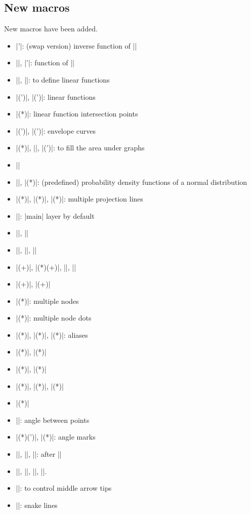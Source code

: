 \subsection{New macros}

New macros have been added.

\begin{itemize}\tightlist
\item |\tzfn'|: (swap version) inverse function of |\tzfn|
\item |\tzfnofy|, |\tzfnofy'|: function of |\y|
\item |\tzdefLFn|, |\tzdefLFnofy|: to define linear functions
\item |\tzLFn(')|, |\tzLFnofy(')|: linear functions
\item |\tzLFnXpoint(*)|: linear function intersection points
\item |\tzfnmin(')|, |\tzfnmax(')|: envelope curves
%
\listdivider
\item |\tzfnarea(*)|, |\settzfnarealayer|, |\tzfnarealine(')|: to fill the area under graphs
\item |\settzfnarealinestyle|
\item |\tzpdfZ|, |\tzpdfN(*)|: (predefined) probability density functions of a normal distribution
\item |\tzprojs(*)|, |\tzprojsx(*)|, |\tzprojsy(*)|: multiple projection lines
\item |\settzpathlayer|: |main| layer by default
%
\listdivider
\item |\tzslope|, |\tzslopeat|
\item |\settzslopelayer|, |\settzslopeatlayer|, |\settzslopeepsilon|
%
\listdivider
\item |\tzlink(+)|, |\tzlinks(*)(+)|, |\settzlinkstyle|, |\settzpathstyle|
\item |\tzedge(+)|, |\tzedges(+)|
%
\listdivider
\item |\tznodes(*)|: multiple nodes
\item |\tznodedots(*)|: multiple node dots
\item |\tznoderectangle(*)|, |\tznodebox(*)|, |\tznodeoval(*)|: aliases
%
\listdivider
\item |\tzring(*)|, |\tzcirclering(*)|
\item |\tzellipsering(*)|, |\tzovalring(*)|
\item |\tzrectanglering(*)|, |\tzframering(*)|, |\tzboxring(*)|
\item |\tzbox(*)|
%
\listdivider
\item |\tzpointangle|: angle between points
\item |\tzanglemark(*)(')|, |\tzrightanglemark(*)|: angle marks
\item |\tzangleresult|, |\tzangleONE|, |\tzangleTWO|: after |\tzanglemark|
\item |\settzAAlinestyle|, |\settzanglelayer|, |\settzAAradius|, |\settzRAsize|.
%
\listdivider
\item |\settzmidarrow|: to control middle arrow tips
\item |\tzsnake|: snake lines
\end{itemize}



